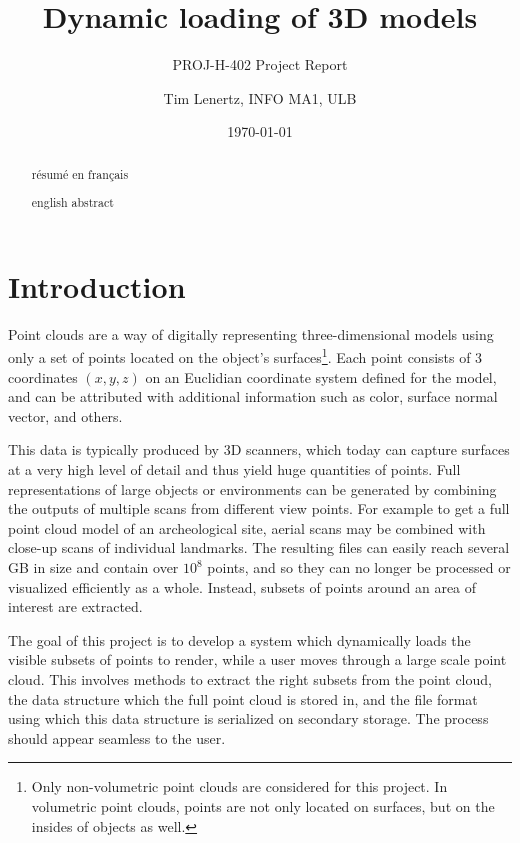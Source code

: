 \documentclass[a4paper,11pt,abstracton,notitlepage]{scrreprt}
\title{Dynamic loading of 3D models}
\subtitle{PROJ-H-402 Project Report}
\author{Tim Lenertz, INFO MA1, ULB}
\date{\today}
\begin{document}
\maketitle{}

\vspace{3cm}
\renewcommand{\abstractname}{Résumé}
\begin{abstract}
résumé en français
\end{abstract}

\vspace{2cm}
\renewcommand{\abstractname}{Abstract}
\begin{abstract}
english abstract
\end{abstract}

\tableofcontents{}

\chapter{Introduction}
Point clouds are a way of digitally representing three-dimensional models using only a set of points located on the object's surfaces\footnote{Only non-volumetric point clouds are considered for this project. In volumetric point clouds, points are not only located on surfaces, but on the insides of objects as well.}. Each point consists of 3 coordinates $(x, y, z)$ on an Euclidian coordinate system defined for the model, and can be attributed with additional information such as color, surface normal vector, and others.

This data is typically produced by 3D scanners, which today can capture surfaces at a very high level of detail and thus yield huge quantities of points. Full representations of large objects or environments can be generated by combining the outputs of multiple scans from different view points. For example to get a full point cloud model of an archeological site, aerial scans may be combined with close-up scans of individual landmarks. The resulting files can easily reach several GB in size and contain over $10^{8}$ points, and so they can no longer be processed or visualized efficiently as a whole. Instead, subsets of points around an area of interest are extracted.

The goal of this project is to develop a system which dynamically loads the visible subsets of points to render, while a user moves through a large scale point cloud. This involves methods to extract the right subsets from the point cloud, the data structure which the full point cloud is stored in, and the file format using which this data structure is serialized on secondary storage. The process should appear seamless to the user.
\end{document}
